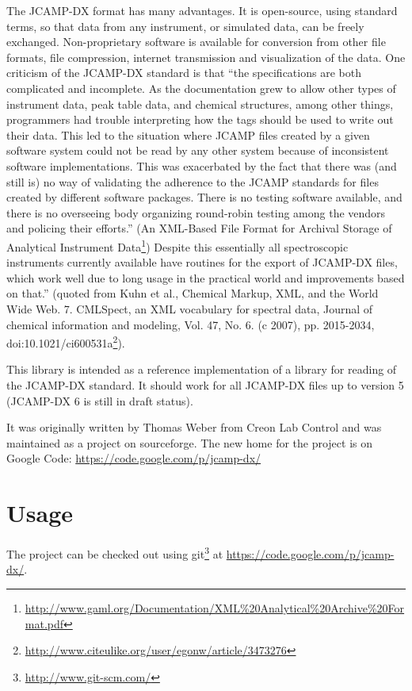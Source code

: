 \documentclass[a4paper]{book}
\begin{document}
The JCAMP-DX format has many advantages. It is open-source, using standard
terms, so that data from any instrument, or simulated data, can be freely
exchanged. Non-proprietary software is available for conversion from other file
formats, file compression, internet transmission and visualization of the data.
One criticism of the JCAMP-DX standard is that ``the specifications are both
complicated and incomplete. As the documentation grew to allow other types of
instrument data, peak table data, and chemical structures, among other things,
programmers had trouble interpreting how the tags should be used to write out
their data. This led to the situation where JCAMP files created by a given
software system could not be read by any other system because of inconsistent
software implementations. This was exacerbated by the fact that there was (and
still is) no way of validating the adherence to the JCAMP standards for files
created by different software packages. There is no testing software available,
and there is no overseeing body organizing round-robin testing among the vendors
and policing their efforts.'' (An XML-Based File Format for Archival Storage of
Analytical Instrument
Data\footnote{\url{http://www.gaml.org/Documentation/XML\%20Analytical\%20Archive\%20Format.pdf}{}})
Despite this essentially all spectroscopic instruments currently available have
routines for the export of JCAMP-DX files, which work well due to long usage in
the practical world and improvements based on that.'' (quoted from Kuhn et al.,
Chemical Markup, XML, and the World Wide Web. 7. CMLSpect, an XML vocabulary for
spectral data, Journal of chemical information and modeling, Vol. 47, No. 6. 
(c 2007), pp. 2015-2034, doi:10.1021/ci600531a\footnote{\url{http://www.citeulike.org/user/egonw/article/3473276}{}}).

This library is intended as a reference implementation of a library for reading
of the JCAMP-DX standard. It should work for all JCAMP-DX files up to version 5
(JCAMP-DX 6 is still in draft status).

It was originally written by Thomas Weber from Creon Lab Control and was
maintained as a project on sourceforge. The new home for the project is on
Google Code: \url{https://code.google.com/p/jcamp-dx/}{}


\chapter{Usage}

The project can be checked out using git\footnote{\url{http://www.git-scm.com/}{}} 
at \url{https://code.google.com/p/jcamp-dx/}{}. 
\end{document}
